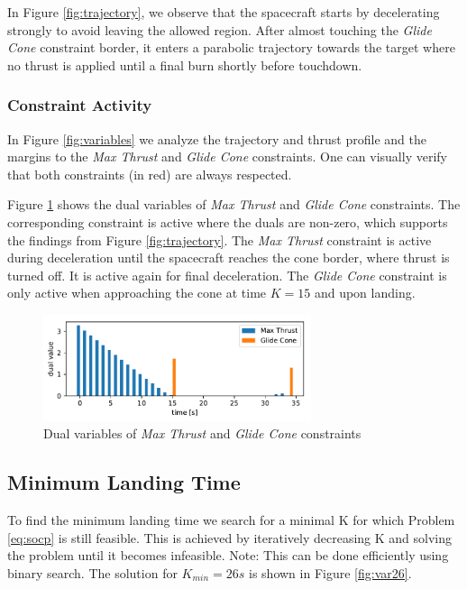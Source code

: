 \documentclass[12pt, letterpaper]{article}
\begin{document}
In Figure \ref{fig:trajectory}, we observe that the spacecraft starts by decelerating strongly to avoid leaving the allowed region. After almost touching the \textit{Glide Cone} constraint border, it enters a parabolic trajectory towards the target where no thrust is applied until a final burn shortly before touchdown.

\subsubsection{Constraint Activity}
In Figure \ref{fig:variables} we analyze the trajectory and thrust profile and the margins to the \textit{Max Thrust} and \textit{Glide Cone} constraints. One can visually verify that both constraints (in red) are always respected.

Figure \ref{fig:duals} shows the dual variables of \textit{Max Thrust} and \textit{Glide Cone} constraints. The corresponding constraint is active where the duals are non-zero, which supports the findings from Figure \ref{fig:trajectory}. The \textit{Max Thrust} constraint is active during deceleration until the spacecraft reaches the cone border, where thrust is turned off. It is active again for final deceleration. The \textit{Glide Cone} constraint is only active when approaching the cone at time $K=15$ and upon landing.

\begin{figure}[H]
    \centering
    \includegraphics[width=0.7\textwidth]{duals.pdf}
    \caption{Dual variables of \textit{Max Thrust} and \textit{Glide Cone} constraints}
    \label{fig:duals}
\end{figure}

\subsection{Minimum Landing Time}
To find the minimum landing time we search for a minimal K for which Problem \ref{eq:socp} is still feasible.
This is achieved by iteratively decreasing K and solving the problem until it becomes infeasible.
Note: This can be done efficiently using binary search. The solution for $K_{min}=26s$ is shown in Figure \ref{fig:var26}.
\end{document}
